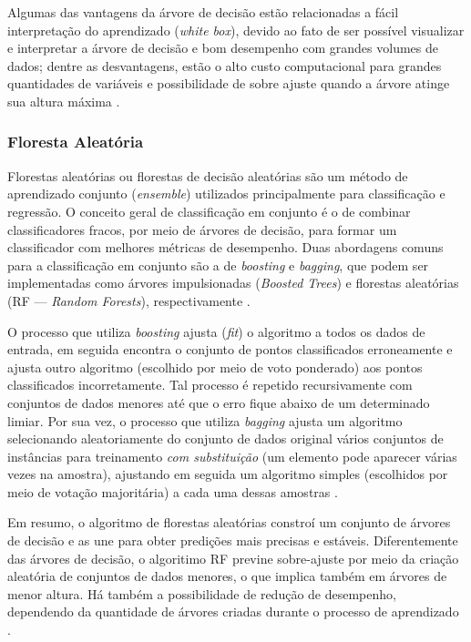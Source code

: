 \documentclass[
	12pt,				%
	oneside,			%
	a4paper,			%
	english,			%
	brazil				%
	]{abntex2ppgsi}
\begin{document}
Algumas das vantagens da árvore de decisão estão relacionadas a fácil interpretação do aprendizado (\textit{white box}), devido ao fato de ser possível visualizar e interpretar a árvore de decisão e bom desempenho com grandes volumes de dados; dentre as desvantagens, estão o alto custo computacional para grandes quantidades de variáveis e possibilidade de sobre ajuste quando a árvore atinge sua altura máxima \cite{kotsiantis2007supervised, dwivedi2016automatic}.

\subsubsection{Floresta Aleatória}

Florestas aleatórias ou florestas de decisão aleatórias são um método de aprendizado conjunto (\textit{ensemble}) utilizados principalmente  para classificação e regressão. O conceito geral de classificação em conjunto é o de combinar classificadores fracos, por meio de árvores de decisão, para formar um classificador com melhores métricas de desempenho. Duas abordagens comuns para a classificação em conjunto são a de \textit{boosting} e \textit{bagging}, que podem ser implementadas como árvores impulsionadas (\textit{Boosted Trees}) e florestas aleatórias (RF --- \textit{Random Forests}), respectivamente \cite{mcdonald2014steering}.

O processo que utiliza \textit{boosting} ajusta (\textit{fit}) o algoritmo a todos os dados de entrada, em seguida encontra o conjunto de pontos classificados erroneamente e ajusta outro algoritmo (escolhido por meio de voto ponderado) aos pontos classificados incorretamente. Tal processo é repetido recursivamente com conjuntos de dados menores até que o erro fique abaixo de um determinado limiar.  Por sua vez, o processo que utiliza \textit{bagging} ajusta um algoritmo selecionando aleatoriamente do conjunto de dados original vários conjuntos de instâncias para treinamento \textit{com substituição} (um elemento pode aparecer várias vezes na amostra), ajustando em seguida um algoritmo simples (escolhidos por meio de votação majoritária) a cada uma dessas amostras \cite{mcdonald2014steering, dogru2018traffic}.

Em resumo, o algoritmo de florestas aleatórias constroí um conjunto de árvores de decisão e as une para obter predições mais precisas e estáveis. Diferentemente das árvores de decisão, o algoritimo RF previne sobre-ajuste por meio da criação aleatória de conjuntos de dados menores, o que implica também em árvores de menor altura. Há também a possibilidade de redução de desempenho, dependendo da quantidade de árvores criadas durante o processo de aprendizado \cite{dogru2018traffic}.
\end{document}
